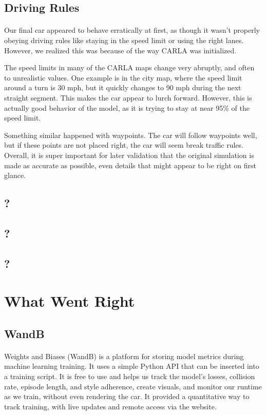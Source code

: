 \documentclass{article}
\begin{document}
\subsection{Driving Rules}
\paragraph{}
Our final car appeared to behave erratically at first, as though it wasn't
properly obeying driving rules like staying in the speed limit or using the
right lanes. However, we realized this was because of the way CARLA was initialized.

The speed limits in many of the CARLA maps change very abruptly, and often to unrealistic values.
One example is in the city map, where the speed limit around a turn is 30 mph, but it quickly changes
to 90 mph during the next straight segment. This makes the car appear to lurch forward. However, this
is actually good behavior of the model, as it is trying to stay at near 95\% of the speed limit.

Something similar happened with waypoints. The car will follow waypoints well, but if these
points are not placed right, the car will seem break traffic rules. Overall, it is super important
for later validation that the original simulation is made as accurate as possible, even details that
might appear to be right on first glance.

\subsection{?}
\subsection{?}
\subsection{?}

\section{What Went Right}

\subsection{
WandB
}
\paragraph{}{}
Weights and Biases (WandB) is a platform for storing model metrics during
machine learning training. It uses a simple Python API that can be inserted
into a training script. It is free to use and helps us track the model's
losses, collision rate, episode length, and style adherence, create
visuals, and monitor our runtime as we train, without even rendering
the car. It provided a quantitative way to track training, with live
updates and remote access via the website. 
\end{document}
